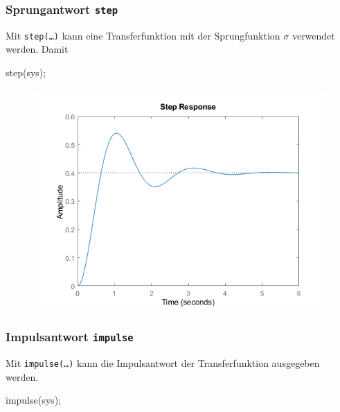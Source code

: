 \documentclass[
  10pt,
  a4paper,
  twocolumn]{article}
\newenvironment{Shaded}{}{}
\newcommand{\NormalTok}[1]{\textcolor[rgb]{0.14,0.16,0.18}{#1}}
\newcommand{\OperatorTok}[1]{\textcolor[rgb]{0.14,0.16,0.18}{#1}}
\newcommand{\VariableTok}[1]{\textcolor[rgb]{0.89,0.38,0.04}{#1}}
\numberwithin{equation}{section}
\begin{document}
\hypertarget{sprungantwort-step}{%
\subsubsection{\texorpdfstring{Sprungantwort
\texttt{step}}{Sprungantwort step}}\label{sprungantwort-step}}

Mit \texttt{step(…)} kann eine Transferfunktion mit der Sprungfunktion
\(\sigma\) verwendet werden. Damit

\begin{Shaded}
\begin{Highlighting}[]
\VariableTok{step}\NormalTok{(}\VariableTok{sys}\NormalTok{)}\OperatorTok{;}
\end{Highlighting}
\end{Shaded}

\begin{figure}[H]

{\centering \includegraphics{images/matlab_StepResponsePlot.png}

}

\end{figure}

\hypertarget{impulsantwort-impulse}{%
\subsubsection{\texorpdfstring{Impulsantwort
\texttt{impulse}}{Impulsantwort impulse}}\label{impulsantwort-impulse}}

Mit \texttt{impulse(…)} kann die Impulsantwort der Transferfunktion
ausgegeben werden.

\begin{Shaded}
\begin{Highlighting}[]
\VariableTok{impulse}\NormalTok{(}\VariableTok{sys}\NormalTok{)}\OperatorTok{;}
\end{Highlighting}
\end{Shaded}
\end{document}
